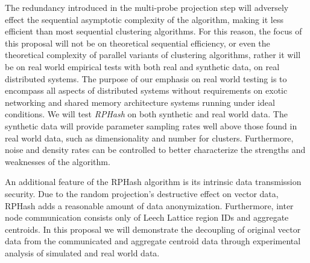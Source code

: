 \documentclass[a4paper,11pt]{article}
\begin{document}
 The redundancy introduced in the multi-probe projection step will adversely effect the sequential asymptotic complexity 
 of the algorithm, making it less efficient than most sequential clustering algorithms. For this reason, the focus of this
 proposal will not be on theoretical sequential efficiency, or even the theoretical complexity of parallel variants of clustering
 algorithms, rather it will be on real world empirical tests with both real
 and synthetic data, on real distributed systems. The purpose of our emphasis on real world testing is to encompass all aspects of
 distributed systems without requirements on exotic networking and shared memory architecture systems running under ideal conditions.
 We will test \emph{RPHash} on both synthetic and real world data. The synthetic data will provide parameter sampling rates
 well above those found in real world data, such as dimensionality and number for clusters. Furthermore, noise and density rates
 can be controlled to better characterize the strengths and weaknesses of the algorithm.
 
 An additional feature of the RPHash algorithm is its intrinsic data transmission security. Due to the random projection's
 destructive effect on vector data, RPHash adds a reasonable amount of data anonymization. Furthermore, inter node
 communication consists only of Leech Lattice region IDs and aggregate centroids. In this proposal we will demonstrate 
 the decoupling of original vector data from the communicated and aggregate centroid data through experimental analysis of
 simulated and real world data.
 
\end{document}
